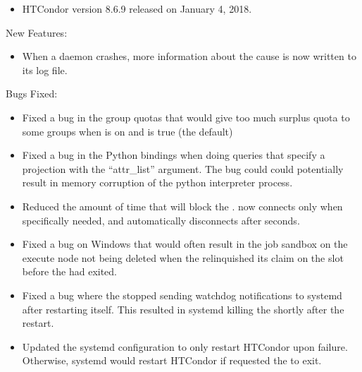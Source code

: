 \begin{itemize}

\item HTCondor version 8.6.9 released on January 4, 2018.

\end{itemize}


\noindent New Features:

\begin{itemize}

\item When a daemon crashes, more information about the cause is now
written to its log file.

\end{itemize}

\noindent Bugs Fixed:

\begin{itemize}

\item Fixed a bug in the group quotas that would give too much surplus
quota to some groups when  is on and
 is true (the default)

\item Fixed a bug in the Python bindings when doing queries that specify a
projection with the ``attr\_list'' argument. The bug could could
potentially result in memory corruption of the python interpreter process.

\item Reduced the amount of time that  will block the
.
 now connects only when specifically needed,
and automatically disconnects after
 seconds.

\item Fixed a bug on Windows that would often result in the job sandbox
on the execute node not being deleted when the  relinquished
its claim on the slot before the  had exited.

\item Fixed a bug where the  stopped sending watchdog
notifications to systemd after restarting itself.
This resulted in systemd killing the  shortly after
the restart.

\item Updated the systemd configuration to only restart HTCondor upon
failure. Otherwise, systemd would restart HTCondor if 
requested the  to exit.


\end{itemize}

